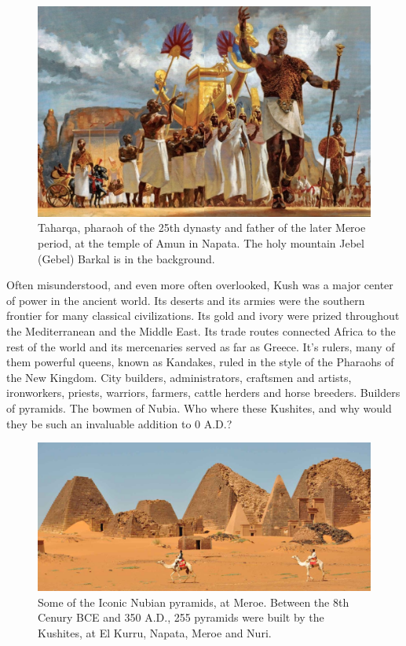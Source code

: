 \documentclass[a4paper,12pt]{scrreprt}
\begin{document}
\begin{figure}[H]
	\centering
	\includegraphics[width=\textwidth]{img/taharqa_pharaoh}
	\caption{Taharqa, pharaoh of the 25th dynasty and father of the later Meroe period, at the temple of Amun in Napata. The holy mountain Jebel (Gebel) Barkal is in the background.}
\end{figure}

Often misunderstood, and even more often overlooked, Kush was a major center of power in the ancient world. Its deserts and its armies were the southern frontier for many classical civilizations. Its gold and ivory were prized throughout the Mediterranean and the Middle East. Its trade routes connected Africa to the rest of the world and its mercenaries served as far as Greece. It’s rulers, many of them powerful queens, known as Kandakes, ruled in the style of the Pharaohs of the New Kingdom. City builders, administrators, craftsmen and artists, ironworkers, priests, warriors, farmers, cattle herders and horse breeders. Builders of pyramids. The bowmen of Nubia. Who where these Kushites, and why would they be such an invaluable addition to 0 A.D.?

\begin{figure}[H]
	\centering
	\includegraphics[width=\textwidth]{img/meroe_pyramids}
	\caption{Some of the Iconic Nubian pyramids, at Meroe. Between the 8th Cenury BCE and 350 A.D., 255 pyramids were built by the Kushites, at El Kurru, Napata, Meroe and Nuri.}
\end{figure}
\end{document}
